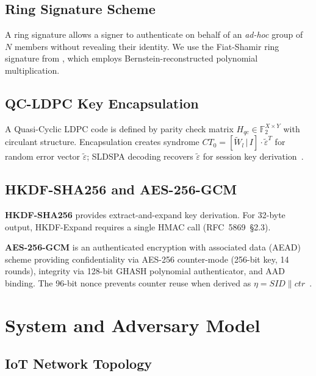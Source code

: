 \documentclass[conference]{IEEEtran}
\newcommand{\SID}{\mathit{SID}}
\begin{document}
\subsection{Ring Signature Scheme}

A ring signature allows a signer to authenticate on behalf of an
\emph{ad-hoc} group of $N$ members without revealing their identity.
We use the Fiat-Shamir ring signature from \cite{kumari2022}, which
employs Bernstein-reconstructed polynomial multiplication.

\subsection{QC-LDPC Key Encapsulation}

A Quasi-Cyclic LDPC code is defined by parity check matrix
$H_{qc} \in \mathbb{F}_2^{X \times Y}$ with circulant structure.
Encapsulation creates syndrome
$CT_0 = [\tilde{W}_l \,|\, I] \cdot \tilde{\varepsilon}^T$ for random
error vector $\tilde{\varepsilon}$; SLDSPA decoding recovers
$\tilde{\varepsilon}$ for session key derivation~\cite{kumari2022}.

\subsection{HKDF-SHA256 and AES-256-GCM}

\textbf{HKDF-SHA256} \cite{rfc5869} provides extract-and-expand key
derivation. For 32-byte output, HKDF-Expand requires a single HMAC
call (RFC~5869~\S2.3).

\textbf{AES-256-GCM} \cite{nist38d} is an authenticated encryption
with associated data (AEAD) scheme providing confidentiality via
AES-256 counter-mode (256-bit key, 14 rounds), integrity via 128-bit
GHASH polynomial authenticator, and AAD binding. The 96-bit nonce
prevents counter reuse when derived as
$\eta = \SID \| ctr$~\cite{nist38d}.

\section{System and Adversary Model}
\label{sec:model}

\subsection{IoT Network Topology}
\end{document}
